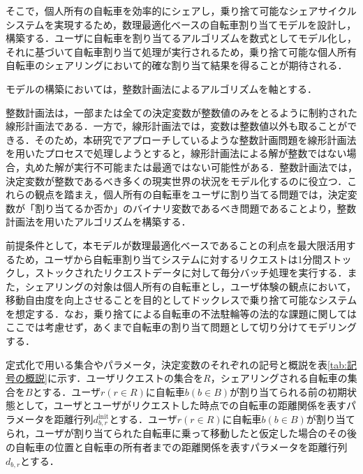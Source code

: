       \par そこで，個人所有の自転車を効率的にシェアし，乗り捨て可能なシェアサイクルシステムを実現するため，数理最適化ベースの自転車割り当てモデルを設計し，構築する．ユーザに自転車を割り当てるアルゴリズムを数式としてモデル化し，それに基づいて自転車割り当て処理が実行されるため，乗り捨て可能な個人所有自転車のシェアリングにおいて的確な割り当て結果を得ることが期待される．
          
      \par モデルの構築においては，整数計画法によるアルゴリズムを軸とする．
          
      \par 整数計画法は，一部または全ての決定変数が整数値のみをとるように制約された線形計画法である．一方で，線形計画法では，変数は整数値以外も取ることができる．そのため，本研究でアプローチしているような整数計画問題を線形計画法を用いたプロセスで処理しようとすると，線形計画法による解が整数ではない場合，丸めた解が実行不可能または最適ではない可能性がある．整数計画法では，決定変数が整数であるべき多くの現実世界の状況をモデル化するのに役立つ．これらの観点を踏まえ，個人所有の自転車をユーザに割り当てる問題では，決定変数が「割り当てるか否か」のバイナリ変数であるべき問題であることより，整数計画法を用いたアルゴリズムを構築する．
          
      \par 前提条件として，本モデルが数理最適化ベースであることの利点を最大限活用するため，ユーザから自転車割り当てシステムに対するリクエストは1分間ストックし，ストックされたリクエストデータに対して毎分バッチ処理を実行する．また，シェアリングの対象は個人所有の自転車とし，ユーザ体験の観点において，移動自由度を向上させることを目的としてドックレスで乗り捨て可能なシステムを想定する．なお，乗り捨てによる自転車の不法駐輪等の法的な課題に関してはここでは考慮せず，あくまで自転車の割り当て問題として切り分けてモデリングする．
          
      \par 定式化で用いる集合やパラメータ，決定変数のそれぞれの記号と概説を表\ref{tab:記号の概説}に示す．ユーザリクエストの集合を$R$，シェアリングされる自転車の集合を$B$とする．ユーザ$r (r \in R)$に自転車$b (b \in B)$が割り当てられる前の初期状態として，ユーザとユーザがリクエストした時点での自転車の距離関係を表すパラメータを距離行列$d^{\text{init}}_{b,r}$とする．ユーザ$r (r \in R)$に自転車$b (b \in B)$が割り当てられ，ユーザが割り当てられた自転車に乗って移動したと仮定した場合のその後の自転車の位置と自転車の所有者までの距離関係を表すパラメータを距離行列$d_{b,r}$とする．
          
